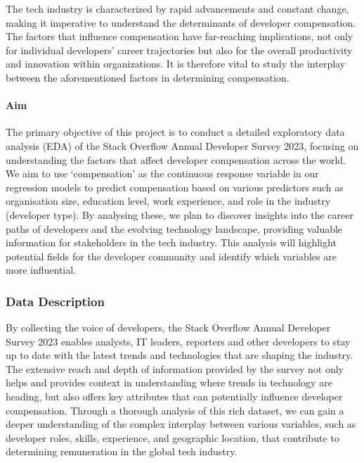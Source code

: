 \documentclass[
  12pt,
]{article}
\begin{document}
The tech industry is characterized by rapid advancements and constant
change, making it imperative to understand the determinants of developer
compensation. The factors that influence compensation have far-reaching
implications, not only for individual developers' career trajectories
but also for the overall productivity and innovation within
organizations. It is therefore vital to study the interplay between the
aforementioned factors in determining compensation.

\hypertarget{aim}{%
\paragraph{Aim}\label{aim}}

The primary objective of this project is to conduct a detailed
exploratory data analysis (EDA) of the Stack Overflow Annual Developer
Survey 2023, focusing on understanding the factors that affect developer
compensation across the world. We aim to use `compensation' as the
continuous response variable in our regression models to predict
compensation based on various predictors such as organisation size,
education level, work experience, and role in the industry (developer
type). By analysing these, we plan to discover insights into the career
paths of developers and the evolving technology landscape, providing
valuable information for stakeholders in the tech industry. This
analysis will highlight potential fields for the developer community and
identify which variables are more influential.

\hypertarget{data-description}{%
\subsubsection{Data Description}\label{data-description}}

By collecting the voice of developers, the Stack Overflow Annual
Developer Survey 2023 enables analysts, IT leaders, reporters and other
developers to stay up to date with the latest trends and technologies
that are shaping the industry. The extensive reach and depth of
information provided by the survey not only helps and provides context
in understanding where trends in technology are heading, but also offers
key attributes that can potentially influence developer compensation.
Through a thorough analysis of this rich dataset, we can gain a deeper
understanding of the complex interplay between various variables, such
as developer roles, skills, experience, and geographic location, that
contribute to determining remuneration in the global tech industry.
\end{document}

